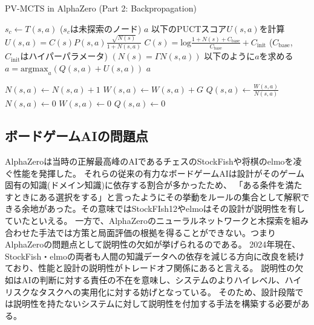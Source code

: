 \begin{algorithm}
    \caption{PV-MCTS in AlphaZero (Part 2: Backpropagation)}
    \label{alg:mcts-2}
    \begin{algorithmic}[1]
                \State $s_c \gets T(s, a)$ ($s_c$は未探索のノード)
                \State {}
                \State \Return $a$
            \Else
                \State 以下のPUCTスコア$U(s, a)$を計算
                \State $U(s, a)= C(s)P(s, a)\frac{\sqrt{N(s)}}{1+N(s, a)}$
                \State $C(s)=\textrm{log}\frac{1+N(s)+C_{\textrm{base}}}{C_{\textrm{base}}}+C_{\textrm{init}}$
                \State($C_{\textrm{base}}$, $C_{\textrm{init}}$はハイパーパラメータ)
                \State $(N(s)=\Gamma N(s, a))$
                \State 以下のように$a$を求める
                \State $a = {\textrm{argmax}}_a (Q(s, a)+U(s, a))$
                \State \Return $a$
                
            \EndIf
        \EndFunction
                \State $N(s, a) \gets  N(s, a)+1$
                \State $W(s, a) \gets  W(s, a)+G$
                \State $Q(s, a) \gets \frac{W(s, a)}{N(s, a)}$
            \EndFor
        \EndFunction
                \State $N(s, a) \gets 0$
                \State $W(s, a) \gets 0$
                \State $Q(s, a) \gets 0$
            \EndFor
        \EndFunction
    \end{algorithmic}
\end{algorithm}


\subsection{ボードゲームAIの問題点}
AlphaZeroは当時の正解最高峰のAIであるチェスのStockFish\cite{StockFish}や将棋のelmo\cite{elmo}を凌ぐ性能を発揮した。
それらの従来の有力なボードゲームAIは設計がそのゲーム固有の知識(ドメイン知識)に依存する割合が多かったため、
「ある条件を満たすときにある選択をする」と言ったようにその挙動をルールの集合として解釈できる余地があった。その意味ではStockFIsh12やelmoはその設計が説明性を有していたといえる。
一方で、AlphaZeroのニューラルネットワークと木探索を組み合わせた手法では方策と局面評価の根拠を得ることができない。つまりAlphaZeroの問題点として説明性の欠如が挙げられるのである。
2024年現在、StockFish・elmoの両者も人間の知識データへの依存を減じる方向に改良を続けており、性能と設計の説明性がトレードオフ関係にあると言える\cite{elmo}\cite{StockFish13}。
説明性の欠如はAIの判断に対する責任の不在を意味し、システムのよりハイレベル、ハイリスクなタスクへの実用化に対する妨げとなっている。
そのため、設計段階では説明性を持たないシステムに対して説明性を付加する手法を構築する必要がある。




